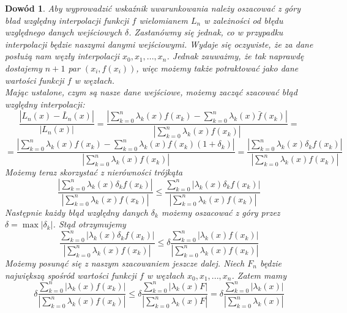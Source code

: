 \documentclass{article}
\newtheorem*{dd}{Dowód}
\begin{document}
\begin{dd}
\normalfont
Aby wyprowadzić wskaźnik uwarunkowania należy oszacować z góry bład względny interpolacji funkcji $f$ wielomianem $L_n$ w zależności od błędu względnego danych wejściowych $\delta$. Zastanówmy się jednak, co w przypadku interpolacji będzie naszymi danymi wejściowymi. Wydaje się oczywiste, że za dane posłużą nam węzły interpolacji $x_0, x_1, ..., x_n$. Jednak zauważmy, że tak naprawdę dostajemy $n+1$ par $(x_i, f(x_i))$, więc możemy także potraktować jako dane wartości funkcji $f$ w węzłach.\\
Mając ustalone, czym są nasze dane wejściowe, możemy zacząć szacować błąd względny interpolacji:
\begin{equation*}
\frac{|L_n(x) - \bar{L}_n(x)|}{|L_n(x)|} = \frac{|\sum_{k = 0}^n \lambda_k(x) f(x_k) - \sum_{k = 0}^n \lambda_k(x) \bar{f}(x_k)|}{|\sum_{k = 0}^n \lambda_k(x) f(x_k)|} = 
\end{equation*} 
\begin{equation*}
 = \frac{|\sum_{k = 0}^n \lambda_k(x) f(x_k) - \sum_{k = 0}^n \lambda_k(x) f(x_k) (1 + \delta_k)|}{|\sum_{k = 0}^n \lambda_k(x) f(x_k)|} = \frac{|\sum_{k = 0}^n \lambda_k(x) \delta_k f(x_k)|}{|\sum_{k = 0}^n \lambda_k(x) f(x_k)|} 
\end{equation*} 
Możemy teraz skorzystać z nierówności trójkąta
\begin{equation*}
\frac{|\sum_{k = 0}^n \lambda_k(x) \delta_k f(x_k)|}{|\sum_{k = 0}^n \lambda_k(x) f(x_k)|} \leq \frac{\sum_{k = 0}^n |\lambda_k(x) \delta_k f(x_k)|}{|\sum_{k = 0}^n \lambda_k(x) f(x_k)|} 
\end{equation*}
Następnie każdy błąd względny danych $\delta_k$ możemy oszacować z góry przez $\delta = \max |\delta_k|$. Stąd otrzymujemy
\begin{equation*}
\frac{\sum_{k = 0}^n |\lambda_k(x) \delta_k f(x_k)|}{|\sum_{k = 0}^n \lambda_k(x) f(x_k)|} \leq \delta \frac{\sum_{k = 0}^n |\lambda_k(x) f(x_k)|}{|\sum_{k = 0}^n \lambda_k(x) f(x_k)|} 
\end{equation*}
Możemy posunąć się z naszym szacowaniem jeszcze dalej. Niech $F_n$ będzie największą spośród wartości funkcji $f$ w węzłach $x_0, x_1, ..., x_n$. Zatem mamy
\begin{equation*}
\delta \frac{\sum_{k = 0}^n |\lambda_k(x) f(x_k)|}{|\sum_{k = 0}^n \lambda_k(x) f(x_k)|} \leq \delta \frac{\sum_{k = 0}^n |\lambda_k(x) F|}{|\sum_{k = 0}^n \lambda_k(x) F|} = \delta \frac{\sum_{k = 0}^n |\lambda_k(x)|}{|\sum_{k = 0}^n \lambda_k(x)|} 
\end{equation*}

\end{dd}
\end{document}
